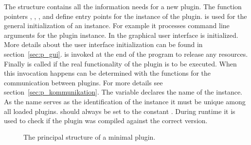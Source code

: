 The structure  contains all the information
\icewing{} needs for a new plugin. The function pointers
, , , and
 define entry points for the instance of the
plugin.  is used for the general initialization of an
instance. For example it processes command line arguments for the
plugin instance. In  the graphical user
interface is initialized. More details about the user interface
initialization can be found in
section~\ref{sec:p_gui}.  is invoked at the end of
the program to release any resources. Finally  is
called if the real functionality of the plugin is to be
executed. When this invocation happens can be determined with the
functions for the communication between plugins. For more details
see section~\ref{sec:p_kommunikation}. The variable 
declares the name of the instance. As the name serves as the
identification of the instance it must be unique among all loaded
plugins.  should always be set to the constant
. During runtime it is used to check if
the plugin was compiled against the correct \icewing{} version.

\begin{figure}[htb]
  \begin{center}
    \begin{small}
    \end{small}
  \end{center}
  \caption[A minimal plugin]
  {The principal structure of a minimal plugin.}
  \label{fig:p_min}
\end{figure}

